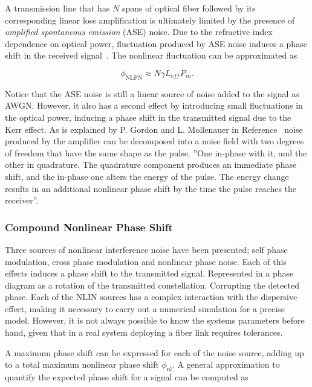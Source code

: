A transmission line that has $N$ spans of optical fiber followed by its corresponding  linear loss amplification is ultimately limited by the presence of \textit{amplified spontaneous emission} (ASE) noise. Due to the refractive index dependence on optical power, fluctuation produced by ASE noise induces a phase shift in the received signal~\cite{gordon1990phase}. The nonlinear  fluctuation  can be approximated as ~\cite{le2015advanced}    

\begin{equation}
\phi_{\text{NLPN}}\approx N\gamma L_{eff}P_{in}.
\end{equation}

Notice that the ASE noise is still a linear source of noise added to the signal as AWGN. However, it also has a second effect by introducing small fluctuations in the optical power, inducing a phase shift in the transmitted signal due to the Kerr effect. As is explained by P. Gordon and L. Mollenauer in Reference~\cite{gordon1990phase} noise produced by the amplifier can be decomposed into a noise field with two degrees of freedom that have the same shape as the pulse. ''One in-phase with it, and the other in quadrature. The quadrature component produces an immediate phase shift, and the in-phase one alters the energy of the pulse. The energy change results in an additional nonlinear phase shift by the time the pulse reaches the receiver''.
\subsubsection{Compound Nonlinear Phase Shift}

Three sources of nonlinear interference noise have  been presented; self phase modulation, cross phase modulation and nonlinear phase noise. Each of this effects induces a phase shift to the transmitted signal. Represented in a phase diagram as a rotation of the transmitted constellation. Corrupting the detected phase. Each of the NLIN sources has a complex interaction with the dispersive effect, making it necessary to carry out a numerical simulation for a precise model. However, it is not always possible to know the systems parameters before hand, given that in a real system deploying a fiber link requires tolerances.

A maximum phase shift can be expressed for each of the noise source, adding  up to a total maximum nonlinear phase shift $\phi_{\text{nl}}$. A general approximation to quantify the expected phase shift for a signal can be computed as

